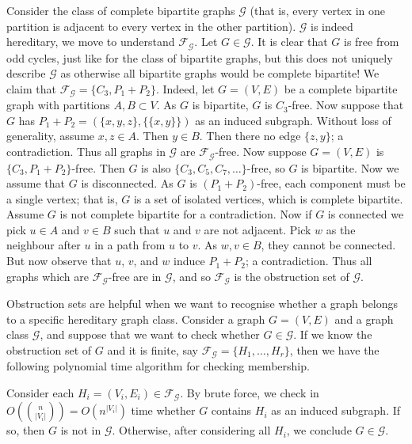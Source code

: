\begin{example}
  Consider the class of complete bipartite graphs $\mathcal G$ (that is, every vertex in one partition is adjacent to every vertex in the other partition). $\mathcal G$ is indeed hereditary, we move to understand $\mathcal F_{\mathcal G}$. Let $G \in \mathcal G$. It is clear that $G$ is free from odd cycles, just like for the class of bipartite graphs, but this does not uniquely describe $\mathcal G$ as otherwise all bipartite graphs would be complete bipartite! We claim that $\mathcal F_{\mathcal G} = \{C_3, P_1 + P_2\}$. Indeed, let $G = (V,E)$ be a complete bipartite graph with partitions $A, B \subset V$. As $G$ is bipartite, $G$ is $C_3$-free. Now suppose that $G$ has $P_1 + P_2 = (\{x,y,z\}, \{\{x,y\}\})$ as an induced subgraph. Without loss of generality, assume $x, z \in A$. Then $y \in B$. Then there no edge $\{z,y\}$; a contradiction. Thus all graphs in $\mathcal G$ are $\mathcal F_{\mathcal G}$-free. Now suppose $G = (V,E)$ is $\{C_3, P_1 + P_2\}$-free. Then $G$ is also $\{C_3, C_5, C_7, \ldots\}$-free, so $G$ is bipartite. Now we assume that $G$ is disconnected. As $G$ is $(P_1 + P_2)$-free, each component must be a single vertex; that is, $G$ is a set of isolated vertices, which is complete bipartite. Assume $G$ is not complete bipartite for a contradiction. Now if $G$ is connected we pick $u \in A$ and $v \in B$ such that $u$ and $v$ are not adjacent. Pick $w$ as the neighbour after $u$ in a path from $u$ to $v$. As $w, v \in B$, they cannot be connected. But now observe that $u$, $v$, and $w$ induce $P_1 + P_2$; a contradiction. Thus all graphs which are $\mathcal F_{\mathcal G}$-free are in $\mathcal G$, and so $\mathcal F_{\mathcal G}$ is the obstruction set of $\mathcal G$.
\end{example}

Obstruction sets are helpful when we want to recognise whether a graph belongs to a specific hereditary graph class. Consider a graph $G = (V,E)$ and a graph class $\mathcal G$, and suppose that we want to check whether $G \in \mathcal G$. If we know the obstruction set of $G$ and it is finite, say $\mathcal F_{\mathcal G} = \{H_1, \ldots, H_r\}$, then we have the following polynomial time algorithm for checking membership.

Consider each $H_i = (V_i, E_i) \in \mathcal F_{\mathcal G}$. By brute force, we check in $O\left(\binom n{\lvert V_i \rvert}\right) = O(n^{\lvert V_i \rvert})$ time whether $G$ contains $H_i$ as an induced subgraph. If so, then $G$ is not in $\mathcal G$. Otherwise, after considering all $H_i$, we conclude $G \in \mathcal G$.

